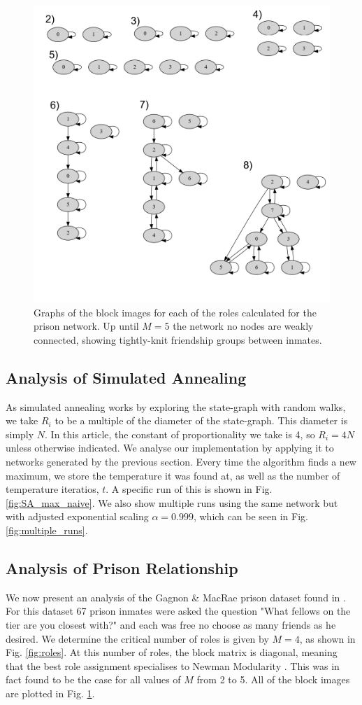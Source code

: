 \documentclass[9pt,twocolumn,twoside,lineno]{pnas-new}
\begin{document}
\begin{figure}%
\centering
\includegraphics[width=.8\linewidth]{figures/blocks_prison}
\caption{Graphs of the block images for each of the roles calculated for the prison network. Up until $M=5$ the network no nodes are weakly connected, showing tightly-knit friendship groups between inmates. } 
\label{fig:prison}
\end{figure}

\subsection*{Analysis of Simulated Annealing}
As simulated annealing works by exploring the state-graph with random walks, we take $R_i$ to be a multiple of the diameter of the state-graph. This diameter is simply  $N$. In this article, the constant of proportionality we take is 4, so $R_i = 4N$ unless otherwise indicated. We analyse our implementation by applying it to networks generated by the previous section. Every time the algorithm finds a new maximum, we store the temperature it was found at, as well as the number of temperature iteratios, $t$. A specific run of this is shown in Fig. \ref{fig:SA_max_naive}. We also show multiple runs using the same network but with adjusted exponential scaling $\alpha = 0.999$, which can be seen in Fig. \ref{fig:multiple_runs}. 


\subsection*{Analysis of Prison Relationship}
We now present an analysis of the Gagnon \& MacRae prison dataset found in \cite{prison}. For this dataset 67 prison inmates were asked the question "What fellows on the tier are you closest with?" and each was free no choose as many friends as he desired. We determine the critical number of roles is given by $M = 4$, as shown in Fig. \ref{fig:roles}. At this number of roles, the block matrix is diagonal, meaning that the best role assignment specialises to Newman Modularity \cite{modularity}. This was in fact found to be the case for all values of  $M$ from 2 to 5. All of the block images are plotted in Fig. \ref{fig:prison}.  
\end{document}
